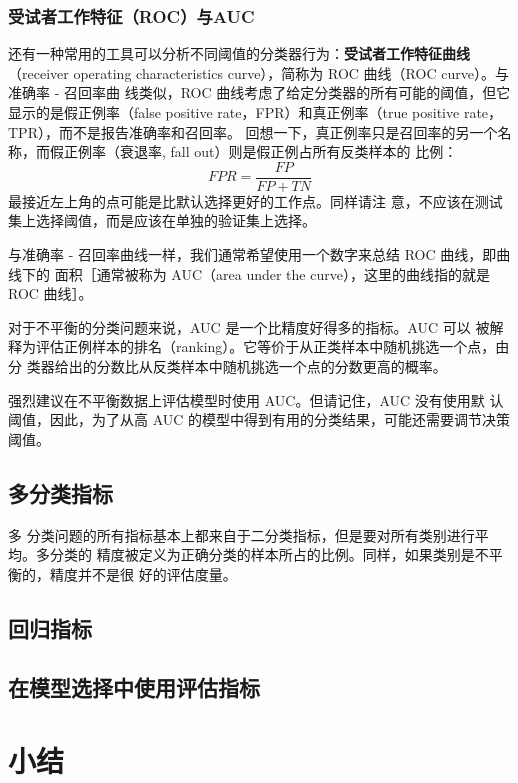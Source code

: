 \subsubsection{受试者工作特征（ROC）与AUC}

还有一种常用的工具可以分析不同阈值的分类器行为：\textbf{受试者工作特征曲线}（receiver
operating characteristics curve），简称为 ROC 曲线（ROC curve）。与准确率 - 召回率曲
线类似，ROC 曲线考虑了给定分类器的所有可能的阈值，但它显示的是假正例率（false
positive rate，FPR）和真正例率（true positive rate，TPR），而不是报告准确率和召回率。
回想一下，真正例率只是召回率的另一个名称，而假正例率（衰退率, fall out）则是假正例占所有反类样本的
比例：
\begin{equation*}
    FPR=\frac{FP}{FP+TN}
\end{equation*}
最接近左上角的点可能是比默认选择更好的工作点。同样请注
意，不应该在测试集上选择阈值，而是应该在单独的验证集上选择。

与准确率 - 召回率曲线一样，我们通常希望使用一个数字来总结 ROC 曲线，即曲线下的
面积［通常被称为 AUC（area under the curve），这里的曲线指的就是 ROC 曲线］。

对于不平衡的分类问题来说，AUC 是一个比精度好得多的指标。AUC 可以
被解释为评估正例样本的排名（ranking）。它等价于从正类样本中随机挑选一个点，由分
类器给出的分数比从反类样本中随机挑选一个点的分数更高的概率。

强烈建议在不平衡数据上评估模型时使用 AUC。但请记住，AUC 没有使用默
认阈值，因此，为了从高 AUC 的模型中得到有用的分类结果，可能还需要调节决策阈值。
\subsection{多分类指标}
多
分类问题的所有指标基本上都来自于二分类指标，但是要对所有类别进行平均。多分类的
精度被定义为正确分类的样本所占的比例。同样，如果类别是不平衡的，精度并不是很
好的评估度量。
\subsection{回归指标}
\subsection{在模型选择中使用评估指标}
\section{小结}